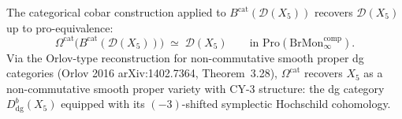 \begin{theorem}
\label{thm:cy-c-quintic-omega-cat-recovery}
The categorical cobar construction applied to
$B^{\mathrm{cat}}(\mathcal D(X_5))$ recovers $\mathcal D(X_5)$ up to
pro-equivalence:
\[
 \Omega^{\mathrm{cat}}\!\bigl( B^{\mathrm{cat}}(\mathcal D(X_5)) \bigr)
 \;\simeq\;
 \mathcal D(X_5)
 \qquad \text{in } \mathrm{Pro}(\mathrm{BrMon}^{\mathrm{comp}}_\infty).
\]
Via the Orlov-type reconstruction for non-commutative smooth proper dg
categories (Orlov 2016 arXiv:1402.7364, Theorem~3.28),
$\Omega^{\mathrm{cat}}$ recovers $X_5$ as a non-commutative smooth
proper variety with CY-$3$ structure: the dg category
$D^b_{\mathrm{dg}}(X_5)$ equipped with its $(-3)$-shifted symplectic
Hochschild cohomology.
\end{theorem}

